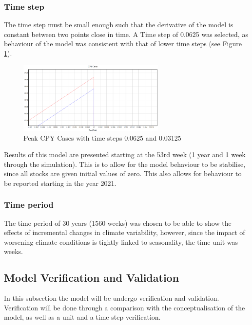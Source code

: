 \subsubsection{Time step}
The time step must be small enough such that the derivative of the model is constant between two points close in time. A Time step of 0.0625 was selected, as behaviour of the model was consistent with that of lower time steps (see Figure \ref{fig:cpy cases with time step}).

\begin{figure}[h!]
\centering
\includegraphics[width=0.65\textwidth]{images/timestep.PNG}
\caption{Peak CPY Cases with time steps 0.0625 and 0.03125}
\label{fig:cpy cases with time step}
\end{figure}

Results of this model are presented starting at the 53rd week (1 year and 1 week through the simulation). This is to allow for the model behaviour to be stabilise, since all stocks are given initial values of zero. This also allows for behaviour to be reported starting in the year 2021.

\subsubsection{Time period}
The time period of 30 years (1560 weeks) was chosen to be able to show the effects of incremental changes in climate variability, however, since the impact of worsening climate conditions is tightly linked to seasonality, the time unit was weeks. %

\subsection{Model Verification and Validation}
In this subsection the model will be undergo verification and validation. Verification will be done through a comparison with the conceptualisation of the model, as well as a unit and a time step verification. 

